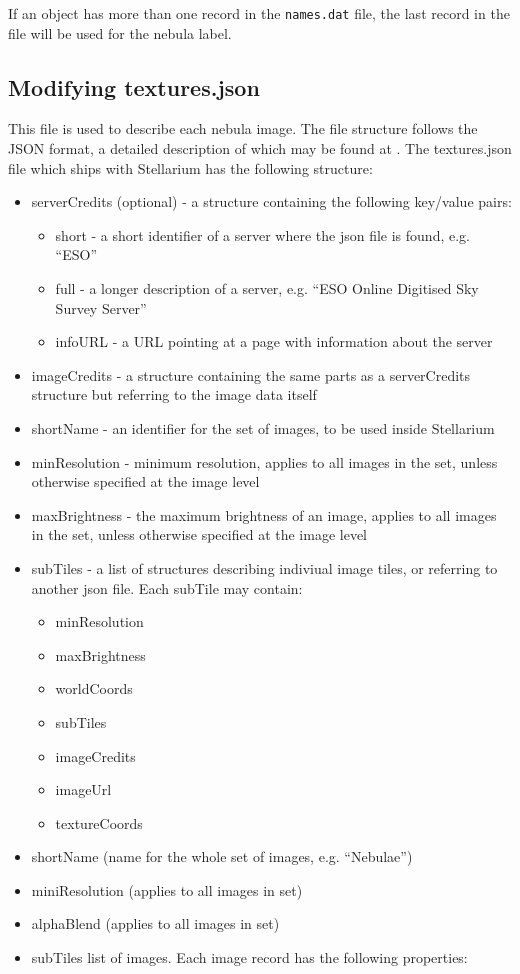 If an object has more than one record in the \texttt{names.dat} file,
the last record in the file will be used for the nebula label.

\subsection{Modifying textures.json}\label{modifying-textures.json}

This file is used to describe each nebula image. The file structure
follows the JSON format, a detailed description of which may be found at
. The textures.json file which ships with Stellarium has the following
structure:

\begin{itemize}
\item
  serverCredits (optional) - a structure containing the following
  key/value pairs:

  \begin{itemize}
  \item
    short - a short identifier of a server where the json file is found,
    e.g. ``ESO''
  \item
    full - a longer description of a server, e.g. ``ESO Online Digitised
    Sky Survey Server''
  \item
    infoURL - a URL pointing at a page with information about the server
  \end{itemize}
\item
  imageCredits - a structure containing the same parts as a
  serverCredits structure but referring to the image data itself
\item
  shortName - an identifier for the set of images, to be used inside
  Stellarium
\item
  minResolution - minimum resolution, applies to all images in the set,
  unless otherwise specified at the image level
\item
  maxBrightness - the maximum brightness of an image, applies to all
  images in the set, unless otherwise specified at the image level
\item
  subTiles - a list of structures describing indiviual image tiles, or
  referring to another json file. Each subTile may contain:

  \begin{itemize}
  \item
    minResolution
  \item
    maxBrightness
  \item
    worldCoords
  \item
    subTiles
  \item
    imageCredits
  \item
    imageUrl
  \item
    textureCoords
  \end{itemize}
\item
  shortName (name for the whole set of images, e.g. ``Nebulae'')
\item
  miniResolution (applies to all images in set)
\item
  alphaBlend (applies to all images in set)
\item
  subTiles list of images. Each image record has the following
  properties:


\end{itemize}
